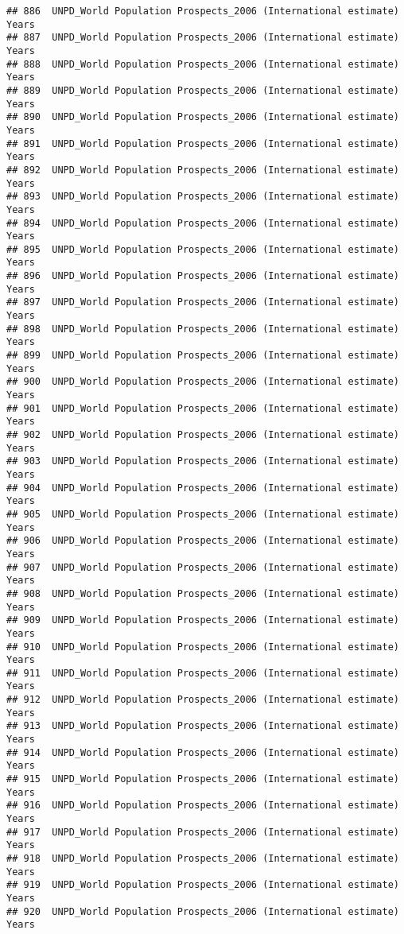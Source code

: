 \documentclass[]{article}
\begin{document}
\begin{verbatim}
## 886  UNPD_World Population Prospects_2006 (International estimate) Years
## 887  UNPD_World Population Prospects_2006 (International estimate) Years
## 888  UNPD_World Population Prospects_2006 (International estimate) Years
## 889  UNPD_World Population Prospects_2006 (International estimate) Years
## 890  UNPD_World Population Prospects_2006 (International estimate) Years
## 891  UNPD_World Population Prospects_2006 (International estimate) Years
## 892  UNPD_World Population Prospects_2006 (International estimate) Years
## 893  UNPD_World Population Prospects_2006 (International estimate) Years
## 894  UNPD_World Population Prospects_2006 (International estimate) Years
## 895  UNPD_World Population Prospects_2006 (International estimate) Years
## 896  UNPD_World Population Prospects_2006 (International estimate) Years
## 897  UNPD_World Population Prospects_2006 (International estimate) Years
## 898  UNPD_World Population Prospects_2006 (International estimate) Years
## 899  UNPD_World Population Prospects_2006 (International estimate) Years
## 900  UNPD_World Population Prospects_2006 (International estimate) Years
## 901  UNPD_World Population Prospects_2006 (International estimate) Years
## 902  UNPD_World Population Prospects_2006 (International estimate) Years
## 903  UNPD_World Population Prospects_2006 (International estimate) Years
## 904  UNPD_World Population Prospects_2006 (International estimate) Years
## 905  UNPD_World Population Prospects_2006 (International estimate) Years
## 906  UNPD_World Population Prospects_2006 (International estimate) Years
## 907  UNPD_World Population Prospects_2006 (International estimate) Years
## 908  UNPD_World Population Prospects_2006 (International estimate) Years
## 909  UNPD_World Population Prospects_2006 (International estimate) Years
## 910  UNPD_World Population Prospects_2006 (International estimate) Years
## 911  UNPD_World Population Prospects_2006 (International estimate) Years
## 912  UNPD_World Population Prospects_2006 (International estimate) Years
## 913  UNPD_World Population Prospects_2006 (International estimate) Years
## 914  UNPD_World Population Prospects_2006 (International estimate) Years
## 915  UNPD_World Population Prospects_2006 (International estimate) Years
## 916  UNPD_World Population Prospects_2006 (International estimate) Years
## 917  UNPD_World Population Prospects_2006 (International estimate) Years
## 918  UNPD_World Population Prospects_2006 (International estimate) Years
## 919  UNPD_World Population Prospects_2006 (International estimate) Years
## 920  UNPD_World Population Prospects_2006 (International estimate) Years

\end{verbatim}
\end{document}
